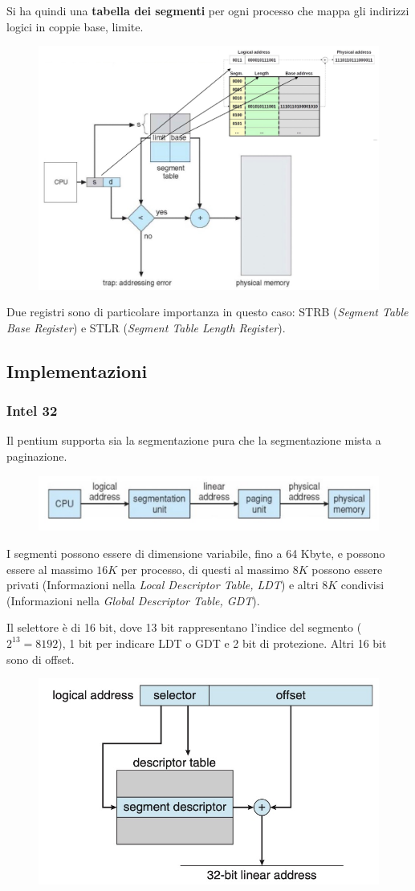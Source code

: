 Si ha quindi una \textbf{tabella dei segmenti} per ogni processo che mappa gli indirizzi logici in coppie base, limite.

\begin{figure}[H]
    \centering
    \includegraphics[width=0.48\linewidth]{assets/segmentazione.jpg}
\end{figure}

Due registri sono di particolare importanza in questo caso: STRB (\textit{Segment Table Base Register}) e STLR (\textit{Segment Table Length Register}).

\subsection{Implementazioni}
\subsubsection{Intel 32}
Il pentium supporta sia la segmentazione pura che la segmentazione mista a paginazione.

\begin{figure}[H]
    \centering
    \includegraphics[width=0.5\linewidth]{assets/architettura-memoria-pentium.jpg}
\end{figure}

I segmenti possono essere di dimensione variabile, fino a 64 Kbyte, e possono essere al massimo $16 K$ per processo, di questi al massimo $8 K$ possono essere privati (Informazioni nella \textit{Local Descriptor Table, LDT}) e altri $8 K$ condivisi (Informazioni nella \textit{Global Descriptor Table, GDT}).

Il selettore è di 16 bit, dove 13 bit rappresentano l'indice del segmento ($2^{13} = 8192$), 1 bit per indicare LDT o GDT e 2 bit di protezione.
Altri 16 bit sono di offset.

\begin{figure}[H]
    \centering
    \includegraphics[width=0.5\linewidth]{assets/pentium-segmentation.jpg}
\end{figure}

